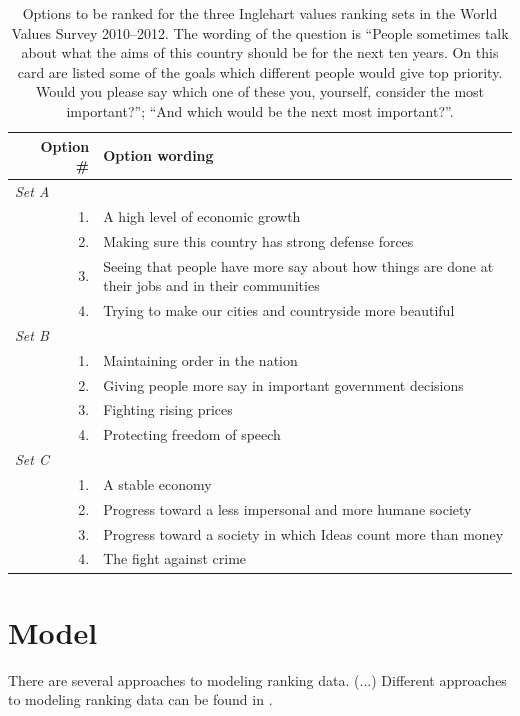 \documentclass[letterpaper,12pt]{article}
\begin{document}
\begin{table}
\begin{tabular}{p{}rp{}}
\hline
& Option \# & Option wording\\
\hline
\multicolumn{3}{l}{\emph{Set A}}\\
&1. & A high level of economic growth\\
&2. & Making sure this country has strong defense forces \\
&3. & Seeing that people have more say about how things are done at their jobs and in their communities\\
&4. & Trying to make our cities and countryside more beautiful\\

\multicolumn{3}{l}{\emph{Set B}}\\
&1. & 	Maintaining order in the nation\\
&2. & Giving people more say in important government decisions \\
&3. & 	Fighting rising prices\\
&4. & Protecting freedom of speech\\

\multicolumn{3}{l}{\emph{Set C}}\\
&1. & 	A stable economy\\
&2. & Progress toward a less impersonal and more humane society \\
&3. & 	Progress toward a society in which Ideas count more than money \\
&4. & 	The fight against crime\\
\hline
	\end{tabular}
\caption{\label{tab:ranking-question}
Options to be ranked for the three Inglehart values ranking sets in 
the World Values Survey 2010--2012. The wording of the question is
``People sometimes talk about what the aims of this country should be for the next ten years. On this card are listed some of the goals which different people would give top priority. Would you please say which one of these you, yourself, consider the most important?''; ``And which would be the next most important?''.
}
\end{table}

\section{Model}

There are several approaches to modeling ranking data. (...)
Different approaches to modeling ranking data can be found in \citet{maydeu2005structural,brown2011item,brown2012fitting}.
\end{document}

